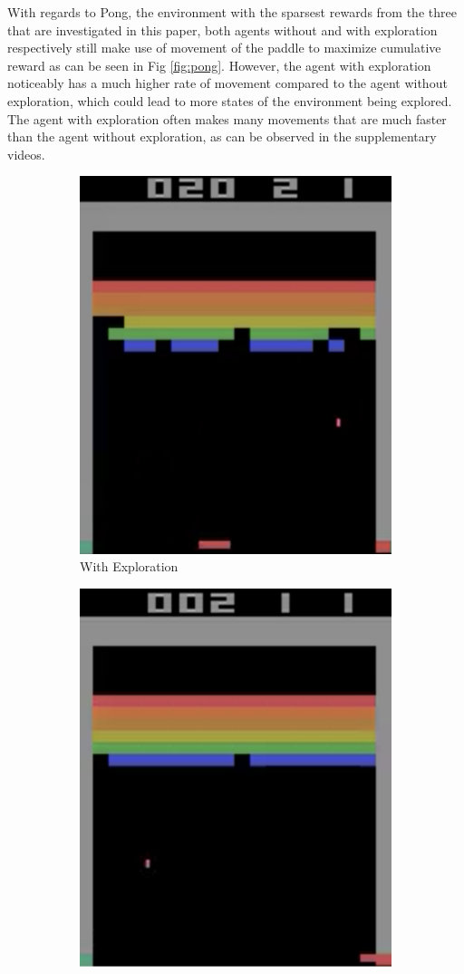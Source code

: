 \documentclass{article}
\begin{document}
With regards to Pong, the environment with the sparsest rewards from the three that are investigated in this paper, both agents without and with exploration respectively still make use of movement of the paddle to maximize cumulative reward as can be seen in Fig \ref{fig:pong}. However, the agent with exploration noticeably has a much higher rate of movement compared to the agent without exploration, which could lead to more states of the environment being explored. The agent with exploration often makes many movements that are much faster than the agent without exploration, as can be observed in the supplementary videos.

\begin{figure}
\centering
\begin{subfigure}{.5\textwidth}
  \centering
  \includegraphics[width=.7\linewidth]{figures/breakout}
  \caption{With Exploration}
\end{subfigure}%
\begin{subfigure}{.5\textwidth}
  \centering
  \includegraphics[width=.7\linewidth]{figures/breakout_no_exp}

\end{subfigure}
\end{figure}
\end{document}
